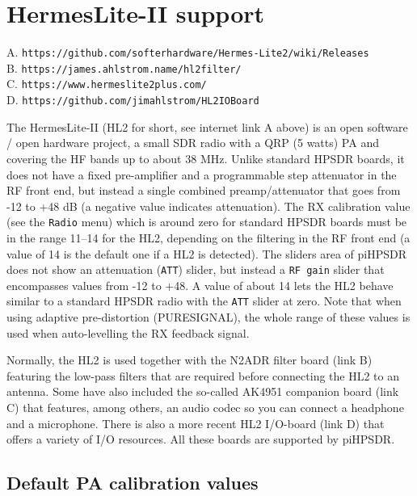 \documentclass[12pt]{book}
\def\bltt#1{\texttt{\color{blue}#1}}
\def\pH{pi\-HPSDR\xspace}
\begin{document}
\section{HermesLite-II support}
\label{sec:hl2support}

A. \texttt{https://github.com/softerhardware/Hermes-Lite2/wiki/Releases} \\
B. \texttt{https://james.ahlstrom.name/hl2filter/}  \\
C. \texttt{https://www.hermeslite2plus.com/}\\
D. \texttt{https://github.com/jimahlstrom/HL2IOBoard}



The HermesLite-II (HL2 for  short, see internet link A above) is an open software / open hardware project,
a small SDR radio with a QRP (5 watts) PA
and covering the HF bands up to about 38 MHz. Unlike standard HPSDR boards, it does not have a fixed
pre-amplifier and a programmable step attenuator in the RF front end, but instead a single combined
preamp/attenuator that goes from -12 to +48 dB (a negative value indicates attenuation). The RX
calibration value (see the \bltt{Radio} menu) which is around zero for standard HPSDR boards must
be in the range 11--14 for the HL2, depending on the filtering in the RF front end
(a value of 14 is the default one if a HL2 is detected). The sliders
area of \pH does not show an attenuation (\texttt{ATT}) slider, but instead a \texttt{RF gain}
slider that encompasses values from -12 to +48. A value of about 14 lets the HL2 behave similar
to a standard HPSDR radio with the \texttt{ATT} slider at zero. Note that when using adaptive
pre-distortion (PURESIGNAL), the whole range of these values is used when auto-levelling the
RX feedback signal.

Normally, the HL2 is used together with the N2ADR  filter
board (link B) featuring the low-pass filters that are required before connecting the HL2 to an antenna.
Some have also included the so-called AK4951 companion board (link C) that features, among others,
 an audio codec so you can connect a headphone and a microphone. There is also a more recent HL2 I/O-board
 (link D) that offers a variety of I/O resources. All these boards are supported by \pH.

\subsection{Default PA calibration values}
\end{document}
